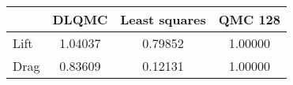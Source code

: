 \begin{tabular}{|l|c|c|c|}
\hline
 &DLQMC&Least squares&QMC 128\\ 
\hline

Lift & 1.04037 & 0.79852 & 1.00000\\ 
\hline
Drag & 0.83609 & 0.12131 & 1.00000\\ 
\hline
\end{tabular}


